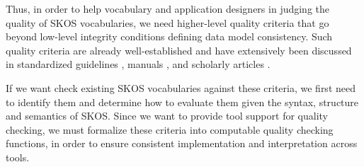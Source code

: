 Thus, in order to help vocabulary and application designers in judging the quality of SKOS vocabularies, we need higher-level quality criteria that go beyond low-level integrity conditions defining data model consistency. Such quality criteria are already well-established and have extensively been discussed in standardized guidelines \cite{ISO25964-1:2011,Z39.19:2005}, manuals \cite{Hedden2010,Aitchison2000,Harpring2010}, and scholarly articles \cite{Coronado2009,Soergel1997,Soergel2002}. 



If we want check existing SKOS vocabularies against these criteria, we first need to identify them and determine how to evaluate them given the syntax, structure and semantics of SKOS. Since we want to provide tool support for quality checking, we must formalize these criteria into computable quality checking functions, in order to ensure consistent implementation and interpretation across tools.


% 
